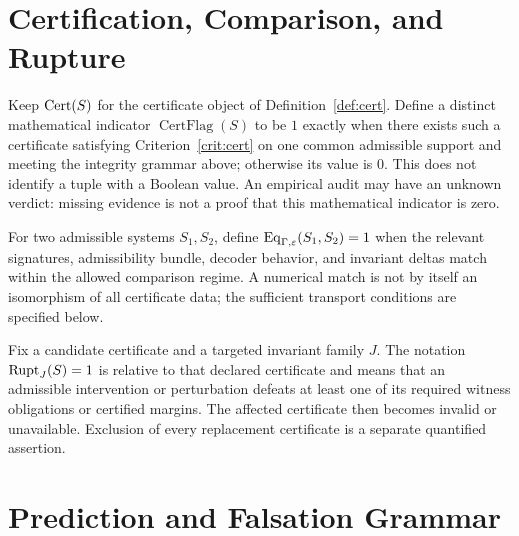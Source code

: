 \section{Certification, Comparison, and Rupture}

\begin{definition}\label{def:operational-certification}
Keep $\mathrm{Cert}(S)$ for the certificate object of Definition~\ref{def:cert}.
Define a distinct mathematical indicator $\operatorname{CertFlag}(S)$ to be
$1$ exactly when there exists such a certificate satisfying Criterion~\ref{crit:cert}
on one common admissible support and meeting the integrity grammar above;
otherwise its value is $0$. This does not identify a tuple with a Boolean value.
An empirical audit may have an unknown verdict: missing evidence is not a proof
that this mathematical indicator is zero.
\end{definition}

\begin{definition}\label{def:equivalence-discriminator}
For two admissible systems $S_1,S_2$, define
$\mathrm{Eq}_{\Gamma,\varepsilon}(S_1,S_2)=1$ when the relevant signatures, admissibility
bundle, decoder behavior, and invariant deltas match within the allowed
comparison regime. A numerical match is not by itself an isomorphism of
all certificate data; the sufficient transport conditions are specified below.
\end{definition}

\begin{definition}\label{def:rupture-event}
Fix a candidate certificate and a targeted invariant family $J$.
The notation $\mathrm{Rupt}_J(S)=1$ is relative to that declared certificate and means
that an admissible intervention or perturbation defeats at least one of its
required witness obligations or certified margins. The affected certificate
then becomes invalid or unavailable. Exclusion of every replacement certificate
is a separate quantified assertion.
\end{definition}

\section{Prediction and Falsation Grammar}

